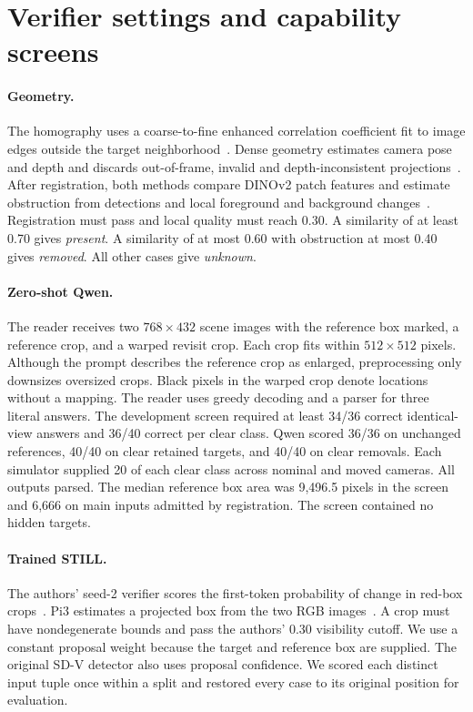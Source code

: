 \section{Verifier settings and capability screens}
\label{app:operating}

\paragraph{Geometry.}
The homography uses a coarse-to-fine enhanced correlation coefficient fit to image edges outside the target neighborhood~\citep{ecc}. Dense geometry estimates camera pose and depth and discards out-of-frame, invalid and depth-inconsistent projections~\citep{vggt,geoscd}. After registration, both methods compare DINOv2 patch features and estimate obstruction from detections and local foreground and background changes~\citep{dinov2,yoloworld}. Registration must pass and local quality must reach 0.30. A similarity of at least 0.70 gives \emph{present}. A similarity of at most 0.60 with obstruction at most 0.40 gives \emph{removed}. All other cases give \emph{unknown}.

\paragraph{Zero-shot Qwen.}
The reader receives two $768\times432$ scene images with the reference box marked, a reference crop, and a warped revisit crop. Each crop fits within $512\times512$ pixels. Although the prompt describes the reference crop as enlarged, preprocessing only downsizes oversized crops. Black pixels in the warped crop denote locations without a mapping. The reader uses greedy decoding and a parser for three literal answers.
The development screen required at least 34/36 correct identical-view answers and 36/40 correct per clear class. Qwen scored 36/36 on unchanged references, 40/40 on clear retained targets, and 40/40 on clear removals. Each simulator supplied 20 of each clear class across nominal and moved cameras. All outputs parsed. The median reference box area was 9,496.5 pixels in the screen and 6,666 on main inputs admitted by registration. The screen contained no hidden targets.

\paragraph{Trained STILL.}
The authors' seed-2 verifier scores the first-token probability of change in red-box crops~\citep{still,still-weights}. Pi3 estimates a projected box from the two RGB images~\citep{pi3}. A crop must have nondegenerate bounds and pass the authors' 0.30 visibility cutoff. We use a constant proposal weight because the target and reference box are supplied. The original SD-V detector also uses proposal confidence. We scored each distinct input tuple once within a split and restored every case to its original position for evaluation.

